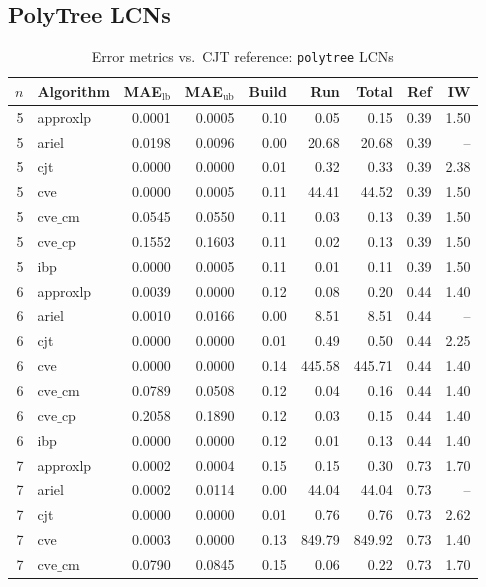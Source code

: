 \documentclass{article}
\begin{document}
\subsection{PolyTree LCNs}
\begin{table}[ht]
\centering
\caption{Error metrics vs.\ CJT reference: \texttt{polytree} LCNs}
\begin{tabular}{rlrrrrrrr}
\toprule
 $n$ & Algorithm & MAE$_{\text{lb}}$ & MAE$_{\text{ub}}$ & Build & Run & Total & Ref & IW \\
\midrule
 5 & approxlp & 0.0001 & 0.0005 & 0.10 & 0.05 & 0.15 & 0.39 & 1.50 \\
 5 & ariel & 0.0198 & 0.0096 & 0.00 & 20.68 & 20.68 & 0.39 & -- \\
 5 & cjt & 0.0000 & 0.0000 & 0.01 & 0.32 & 0.33 & 0.39 & 2.38 \\
 5 & cve & 0.0000 & 0.0005 & 0.11 & 44.41 & 44.52 & 0.39 & 1.50 \\
 5 & $\text{cve\_cm}$ & 0.0545 & 0.0550 & 0.11 & 0.03 & 0.13 & 0.39 & 1.50 \\
 5 & $\text{cve\_cp}$ & 0.1552 & 0.1603 & 0.11 & 0.02 & 0.13 & 0.39 & 1.50 \\
 5 & ibp & 0.0000 & 0.0005 & 0.11 & 0.01 & 0.11 & 0.39 & 1.50 \\
\hline
 6 & approxlp & 0.0039 & 0.0000 & 0.12 & 0.08 & 0.20 & 0.44 & 1.40 \\
 6 & ariel & 0.0010 & 0.0166 & 0.00 & 8.51 & 8.51 & 0.44 & -- \\
 6 & cjt & 0.0000 & 0.0000 & 0.01 & 0.49 & 0.50 & 0.44 & 2.25 \\
 6 & cve & 0.0000 & 0.0000 & 0.14 & 445.58 & 445.71 & 0.44 & 1.40 \\
 6 & $\text{cve\_cm}$ & 0.0789 & 0.0508 & 0.12 & 0.04 & 0.16 & 0.44 & 1.40 \\
 6 & $\text{cve\_cp}$ & 0.2058 & 0.1890 & 0.12 & 0.03 & 0.15 & 0.44 & 1.40 \\
 6 & ibp & 0.0000 & 0.0000 & 0.12 & 0.01 & 0.13 & 0.44 & 1.40 \\
\hline
 7 & approxlp & 0.0002 & 0.0004 & 0.15 & 0.15 & 0.30 & 0.73 & 1.70 \\
 7 & ariel & 0.0002 & 0.0114 & 0.00 & 44.04 & 44.04 & 0.73 & -- \\
 7 & cjt & 0.0000 & 0.0000 & 0.01 & 0.76 & 0.76 & 0.73 & 2.62 \\
 7 & cve & 0.0003 & 0.0000 & 0.13 & 849.79 & 849.92 & 0.73 & 1.40 \\
 7 & $\text{cve\_cm}$ & 0.0790 & 0.0845 & 0.15 & 0.06 & 0.22 & 0.73 & 1.70 \\

\end{tabular}
\end{table}
\end{document}
